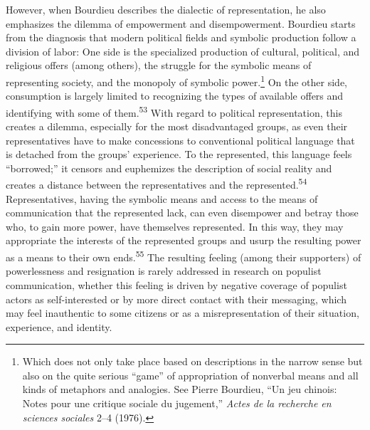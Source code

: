 \documentclass{tufte-handout}
\begin{document}
However, when Bourdieu describes the dialectic of representation, he
also emphasizes the dilemma of empowerment and disempowerment. Bourdieu
starts from the diagnosis that modern political fields and symbolic
production follow a division of labor: One side is the specialized
production of cultural, political, and religious offers (among others),
the struggle for the symbolic means of representing society, and the
monopoly of symbolic power.\footnote{Which does not only take place
  based on descriptions in the narrow sense but also on the quite
  serious ``game'' of appropriation of nonverbal means and all kinds of
  metaphors and analogies. See Pierre Bourdieu, ``Un jeu chinois: Notes
  pour une critique sociale du jugement,'' \emph{Actes de la recherche
  en sciences sociales} 2--4 (1976).} On the other side, consumption is
largely limited to recognizing the types of available offers and
identifying with some of them.\textsuperscript{53} With regard to
political representation, this creates a dilemma, especially for the
most disadvantaged groups, as even their representatives have to make
concessions to conventional political language that is detached from the
groups' experience. To the represented, this language feels
``borrowed;'' it censors and euphemizes the description of social
reality and creates a distance between the representatives and the
represented.\textsuperscript{54} Representatives,
having the symbolic means and access to the means of communication that
the represented lack, can even disempower and betray those who, to gain
more power, have themselves represented. In this way, they may
appropriate the interests of the represented groups and usurp the
resulting power as a means to their own ends.\textsuperscript{55} The
resulting feeling (among their supporters) of powerlessness and
resignation is rarely addressed in research on populist communication,
whether this feeling is driven by negative coverage of populist actors
as self-interested or by more direct contact with their messaging, which
may feel inauthentic to some citizens or as a misrepresentation of their
situation, experience, and identity.
\end{document}

